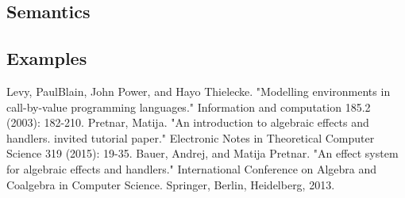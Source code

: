 \documentclass[12pt]{article}
\begin{document}
\subsection{Semantics}
\subsection{Examples}

\begin{thebibliography}{9}
Levy, PaulBlain, John Power, and Hayo Thielecke. "Modelling environments in call-by-value programming languages." Information and computation 185.2 (2003): 182-210.
Pretnar, Matija. "An introduction to algebraic effects and handlers. invited tutorial paper." Electronic Notes in Theoretical Computer Science 319 (2015): 19-35.
Bauer, Andrej, and Matija Pretnar. "An effect system for algebraic effects and handlers." International Conference on Algebra and Coalgebra in Computer Science. Springer, Berlin, Heidelberg, 2013.
\end{thebibliography}
\end{document}
